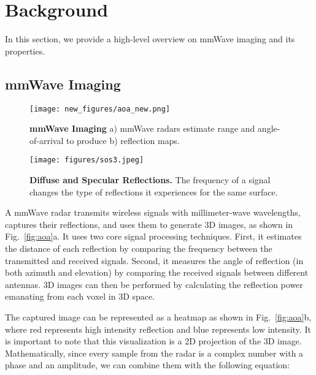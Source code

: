 
\vspace{-0.1pt}
\section{Background}
\vspace{-0.1pt}

In this section, we provide a high-level overview on mmWave imaging and its properties. 


\subsection{mmWave Imaging} \label{sec:bg_imaging}
\vspace{-0.1pt}

\begin{figure}
\begin{minipage}[t]{0.23\textwidth}
\centering
    \texttt{[image: new\_figures/aoa\_new.png]}
    \vspace{-0.23in}
    \caption{\footnotesize{\textbf{mmWave Imaging}} \textnormal{a) mmWave radars  estimate range and angle-of-arrival to produce b) reflection maps.}} 
    \label{fig:aoa}
    \vspace{-0.225in}
\end{minipage}
\hfill
\begin{minipage}[t]{0.23\textwidth}
\centering
        \texttt{[image: figures/sos3.jpeg]}
    \vspace{-0.23in}
    \caption{\footnotesize{\textbf{Diffuse and Specular Reflections.}} \textnormal{The frequency of a signal changes the type of reflections it experiences for the same surface.}} 
    \label{fig:diffuse}
    \vspace{-0.225in}
\end{minipage}
\end{figure}

A mmWave radar transmits wireless signals with millimeter-wave wavelengths, captures their reflections, and uses them to generate 3D images, as shown in Fig.~\ref{fig:aoa}a. It uses two core signal processing techniques. First, it estimates the distance of each reflection by comparing the frequency between the transmitted and received signals. Second, it measures the angle of reflection (in both azimuth and elevation) by comparing the received signals between different antennas. 3D images can then be performed by calculating the reflection power emanating from each voxel in 3D space. 

The captured image can be represented as a heatmap as shown in Fig.~\ref{fig:aoa}b, where red represents high intensity reflection and blue represents low intensity. It is important to note that this visualization is a 2D projection of the 3D image. Mathematically, since every sample from the radar is a complex number with a phase and an amplitude, we can combine them with the following equation: 


